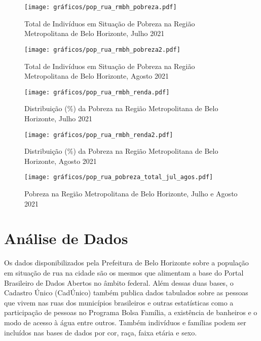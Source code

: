 \documentclass[12pt]{article}
\begin{document}
\begin{figure}[H]
\centering
	\caption{Total de Indivíduos em Situação de Pobreza na Região Metropolitana de Belo Horizonte, Julho 2021}
	\texttt{[image: gráficos/pop\_rua\_rmbh\_pobreza.pdf]}
	\label{fig:mapa_pop_rua_pobreza}
\end{figure}

\begin{figure}[H]
\centering
	\caption{Total de Indivíduos em Situação de Pobreza na Região Metropolitana de Belo Horizonte, Agosto 2021}
	\texttt{[image: gráficos/pop\_rua\_rmbh\_pobreza2.pdf]}
	\label{fig:mapa_pop_rua_pobreza2}
\end{figure}


\begin{figure}[H]
\centering
	\caption{Distribuição (\%) da Pobreza na Região Metropolitana de Belo Horizonte, Julho 2021}
	\texttt{[image: gráficos/pop\_rua\_rmbh\_renda.pdf]}
	\label{fig:mapa_pop_rua_renda}
\end{figure}


\begin{figure}[H]
\centering
	\caption{Distribuição (\%) da Pobreza na Região Metropolitana de Belo Horizonte, Agosto 2021}
	\texttt{[image: gráficos/pop\_rua\_rmbh\_renda2.pdf]}
	\label{fig:mapa_pop_rua_renda2}
\end{figure}

\begin{landscape}
\pagestyle{empty}
\begin{figure}[H]
\centering
	\caption{Pobreza na Região Metropolitana de Belo Horizonte, Julho e Agosto 2021}
	\texttt{[image: gráficos/pop\_rua\_pobreza\_total\_jul\_agos.pdf]}
	\label{fig:pop_rua_pobreza_total_jul_agos}
\end{figure}
\end{landscape}

\newpage

\section{Análise de Dados}
\vspace{1cm}

Os dados disponibilizados pela Prefeitura de Belo Horizonte sobre a população em situação de rua na cidade são os mesmos que alimentam a base do Portal Brasileiro de Dados Abertos no âmbito federal. Além dessas duas bases, o Cadastro Único (CadÚnico) também publica dados tabulados sobre as pessoas que vivem nas ruas dos municípios brasileiros e outras estatísticas como a participação de pessoas no Programa Bolsa Família, a existência de banheiros e o modo de acesso à água entre outros. Também indivíduos e famílias podem ser incluídos nas bases de dados por cor, raça, faixa etária e sexo.\\ 
\end{document}
